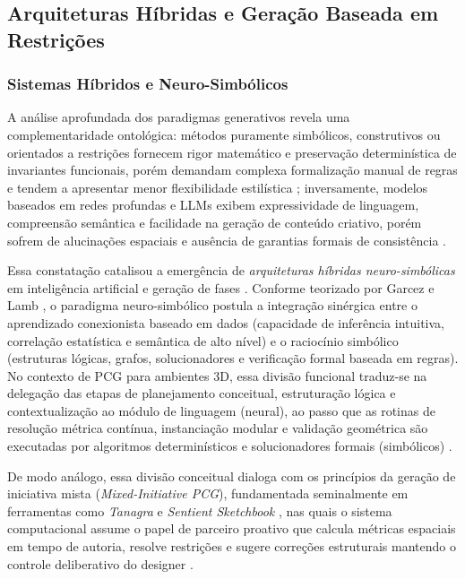 \subsection{Arquiteturas Híbridas e Geração Baseada em Restrições}
\label{sec:arquiteturas_hibridas}

\subsubsection{Sistemas Híbridos e Neuro-Simbólicos}
\label{sec:sistemas_hibridos}

A análise aprofundada dos paradigmas generativos revela uma complementaridade ontológica: métodos puramente simbólicos, construtivos ou orientados a restrições fornecem rigor matemático e preservação determinística de invariantes funcionais, porém demandam complexa formalização manual de regras e tendem a apresentar menor flexibilidade estilística \cite{shaker2016constructive, summerville2018procedural}; inversamente, modelos baseados em redes profundas e LLMs exibem expressividade de linguagem, compreensão semântica e facilidade na geração de conteúdo criativo, porém sofrem de alucinações espaciais e ausência de garantias formais de consistência \cite{Gallotta_2024, maleki2024procedural}.

Essa constatação catalisou a emergência de \textit{arquiteturas híbridas neuro-simbólicas} em inteligência artificial e geração de fases \cite{garcez2023neurosymbolic, Gallotta_2024, xu2025constraint}. Conforme teorizado por Garcez e Lamb \cite{garcez2023neurosymbolic}, o paradigma neuro-simbólico postula a integração sinérgica entre o aprendizado conexionista baseado em dados (capacidade de inferência intuitiva, correlação estatística e semântica de alto nível) e o raciocínio simbólico (estruturas lógicas, grafos, solucionadores e verificação formal baseada em regras). No contexto de PCG para ambientes 3D, essa divisão funcional traduz-se na delegação das etapas de planejamento conceitual, estruturação lógica e contextualização ao módulo de linguagem (neural), ao passo que as rotinas de resolução métrica contínua, instanciação modular e validação geométrica são executadas por algoritmos determinísticos e solucionadores formais (simbólicos) \cite{hu2024scenecraft, tang2025unrealllm, chen2025narrative, xu2025constraint, xu2025databasedrivenframework3dlevel, her2025zeroshot3dmapgeneration}.

De modo análogo, essa divisão conceitual dialoga com os princípios da geração de iniciativa mista (\textit{Mixed-Initiative PCG}), fundamentada seminalmente em ferramentas como \textit{Tanagra} \cite{tanagra} e \textit{Sentient Sketchbook} \cite{liapis2013sentient}, nas quais o sistema computacional assume o papel de parceiro proativo que calcula métricas espaciais em tempo de autoria, resolve restrições e sugere correções estruturais mantendo o controle deliberativo do designer \cite{tanagra, liapis2013sentient, lai2020towards, walton2020evaluating, wang2026designerlyloop}.

